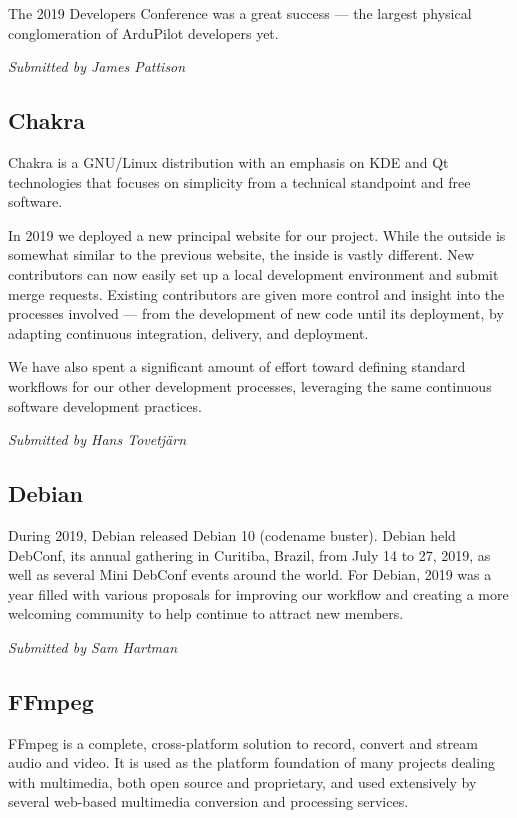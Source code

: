 \documentclass[a4paper]{report}
\begin{document}
The 2019 Developers Conference was a great success --- the largest
physical conglomeration of ArduPilot developers yet.

{\em Submitted by James Pattison}

\subsection{Chakra}

Chakra is a GNU/Linux distribution with an emphasis on KDE and Qt
technologies that focuses on simplicity from a technical standpoint and
free software.

In 2019 we deployed a new principal website for our project. While the
outside is somewhat similar to the previous website, the inside is
vastly different. New contributors can now easily set up a local
development environment and submit merge requests.  Existing
contributors are given more control and insight into the processes
involved --- from the development of new code until its deployment, by
adapting continuous integration, delivery, and deployment.

We have also spent a significant amount of effort toward defining
standard workflows for our other development processes, leveraging the
same continuous software development practices.

{\em Submitted by Hans Tovetjärn}

\subsection{Debian}

During 2019, Debian released Debian 10 (codename buster).  Debian held
DebConf, its annual gathering in Curitiba, Brazil, from July 14 to 27,
2019, as well as several Mini DebConf events around the world.  For
Debian, 2019 was a year filled with various proposals for improving our
workflow and creating a more welcoming community to help continue to
attract new members.

{\em Submitted by Sam Hartman}

\subsection{FFmpeg}

FFmpeg is a complete, cross-platform solution to record, convert and
stream audio and video. It is used as the platform foundation of many
projects dealing with multimedia, both open source and proprietary, and
used extensively by several web-based multimedia conversion and
processing services.
\end{document}
